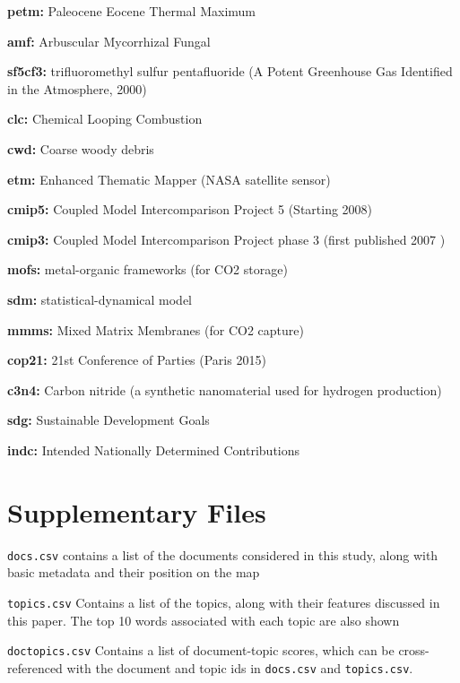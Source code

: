 \documentclass{article}
\begin{document}
\begin{linenumbers}
		\noindent\textbf{petm:} Paleocene Eocene Thermal Maximum
		
		\noindent\textbf{amf:}  Arbuscular Mycorrhizal Fungal
		
		\noindent\textbf{sf5cf3:} trifluoromethyl sulfur pentafluoride (A Potent Greenhouse Gas Identified in the Atmosphere, 2000)
		
		\noindent\textbf{clc:} Chemical Looping Combustion
		
		\noindent\textbf{cwd:} Coarse woody debris
		
		\noindent\textbf{etm:} Enhanced Thematic Mapper (NASA satellite sensor)
		
		\noindent\textbf{cmip5:} Coupled Model Intercomparison Project 5 (Starting 2008)
		
		\noindent\textbf{cmip3:} Coupled Model Intercomparison Project phase 3 (first published 2007 \cite{Meehl2007})
		
		\noindent\textbf{mofs:} metal-organic frameworks (for CO2 storage)
		
		\noindent\textbf{sdm:} statistical-dynamical model
		
		\noindent\textbf{mmms:} Mixed Matrix Membranes (for CO2 capture)
		
		\noindent\textbf{cop21:} 21st Conference of Parties (Paris 2015) 
		
		\noindent\textbf{c3n4:} Carbon nitride (a synthetic nanomaterial used for hydrogen production)
		
		\noindent\textbf{sdg:} Sustainable Development Goals
		
		\noindent\textbf{indc:} Intended Nationally Determined Contributions
		
		
	\end{linenumbers}
	
	\linespread{1}
	
	\section*{Supplementary Files}
	
	\texttt{docs.csv} contains a list of the documents considered in this study, along with basic metadata and their position on the map
	
	\medskip\noindent
	\texttt{topics.csv} Contains a list of the topics, along with their features discussed in this paper. The top 10 words associated with each topic are also shown

\medskip\noindent
	\texttt{doctopics.csv} Contains a list of document-topic scores, which can be cross-referenced with the document and topic ids in \texttt{docs.csv} and \texttt{topics.csv}.
	
\end{document}

